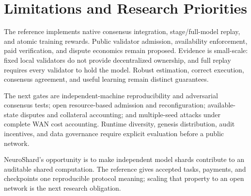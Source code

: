 \documentclass[conference]{IEEEtran}
\begin{document}
\section{Limitations and Research Priorities}

The reference implements native consensus integration, stage/full-model replay, and atomic training rewards. Public validator admission, availability enforcement, paid verification, and dispute economics remain proposed. Evidence is small-scale: fixed local validators do not provide decentralized ownership, and full replay requires every validator to hold the model. Robust estimation, correct execution, consensus agreement, and useful learning remain distinct guarantees.

The next gates are independent-machine reproducibility and adversarial consensus tests; open resource-based admission and reconfiguration; available-state disputes and collateral accounting; and multiple-seed attacks under complete WAN cost accounting. Runtime diversity, genesis distribution, audit incentives, and data governance require explicit evaluation before a public network.

NeuroShard's opportunity is to make independent model shards contribute to an auditable shared computation. The reference gives accepted tasks, payments, and checkpoints one reproducible protocol meaning; scaling that property to an open network is the next research obligation.
\end{document}
